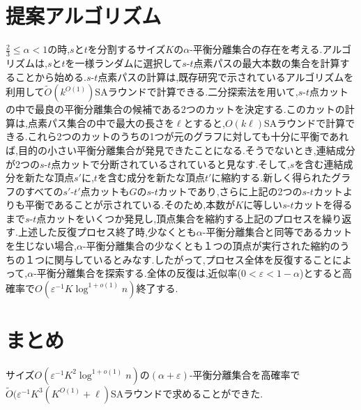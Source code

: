 \documentclass[a4j,twoside]{jarticle}
\begin{document}
\begin{論文概要}
\section{提案アルゴリズム}
$\frac{2}{3} \leq \alpha < 1$の時,$s$と$t$を分割するサイズ$K$の$\alpha$-平衡分離集合の存在を考える.アルゴリズムは,$s$と$t$を一様ランダムに選択して$s$-$t$点素パスの最大本数の集合を計算することから始める.$s$-$t$点素パスの計算は,既存研究で示されているアルゴリズム\cite{li2018distributed}を利用して$\tilde{O}(k^{O(1)})$SAラウンドで計算できる.二分探索法を用いて,$s$-$t$点カットの中で最良の平衡分離集合の候補である2つのカットを決定する.このカットの計算は,点素パス集合の中で最大の長さを$\ell$とすると,$O(k\ell)$SAラウンドで計算できる.これら2つのカットのうちの1つが元のグラフに対しても十分に平衡であれば,目的の小さい平衡分離集合が発見できたことになる.そうでないとき,連結成分が2つの$s$-$t$点カットで分断されているされていると見なす.そして,$s$を含む連結成分を新たな頂点$s'$に,$t$を含む成分を新たな頂点$t'$に縮約する.新しく得られたグラフのすべての$s'$-$t'$点カットも$G$の$s$-$t$カットであり,さらに上記の2つの$s$-$t$カットよりも平衡であることが示されている.そのため,本数が$K$に等しい$s$-$t$カットを得るまで$s$-$t$点カットをいくつか発見し,頂点集合を縮約する上記のプロセスを繰り返す.上述した反復プロセス終了時,少なくとも$\alpha$-平衡分離集合と同等であるカットを生じない場合,$\alpha$-平衡分離集合の少なくとも１つの頂点が実行された縮約のうちの１つに関与しているとみなす.したがって,プロセス全体を反復することによって,$\alpha$-平衡分離集合を探索する.全体の反復は,近似率($0 < \varepsilon < 1-\alpha$)とすると高確率で$O(\varepsilon^{-1}K\log^{1+o(1)}n)$終了する.
\section{まとめ}
サイズ$O(\varepsilon^{-1}K^2\log^{1+o(1)}n)$の$(\alpha + \varepsilon)$-平衡分離集合を高確率で$\tilde{O}(\varepsilon^{-1}K^3(K^{O(1)}+\ell)$SAラウンドで求めることができた.


\clearpage                       %
\end{論文概要}                   %
\end{document}
